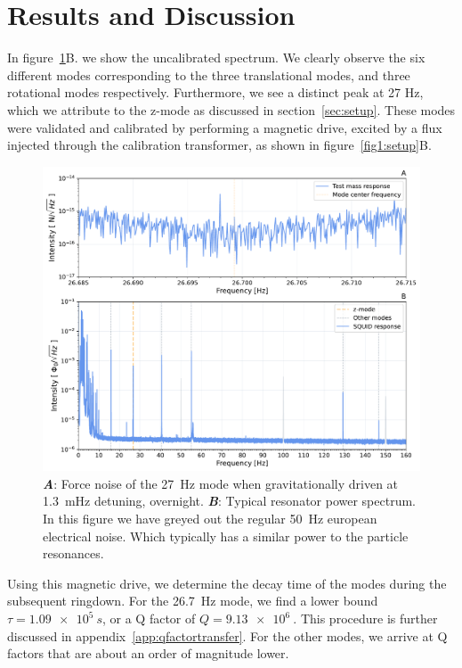 \section{Results and  Discussion} \label{sec:results}
In figure~\ref{fig2:spectrum}B. we show the uncalibrated spectrum.
We clearly observe the six different modes corresponding to the three translational modes, and three rotational modes respectively. 
Furthermore, we see a distinct peak at 27 Hz, which we attribute to the z-mode as discussed in section~\ref{sec:setup}.
These modes were validated and calibrated by performing a magnetic drive, excited by a flux injected through the calibration transformer, as shown in figure~\ref{fig1:setup}B. 

\begin{figure}[ht]%
\centering
\includegraphics[width=\textwidth]{Results/paper_spectrum_combined.pdf}%
\caption{\textbf{\emph{A}}: Force noise of the \SI{27}{Hz} mode when gravitationally driven at \SI{1.3}{mHz} detuning, overnight. \textbf{\emph{B}}: Typical resonator power spectrum. In this figure we have greyed out the regular \SI{50}{Hz} european electrical noise. Which typically has a similar power to the particle resonances.}\label{fig2:spectrum}
\end{figure}

Using this magnetic drive, we determine the decay time of the modes during the subsequent ringdown. For the \SI{26.7}{Hz} mode, we find a lower bound  $\tau = \SI{1.09e5}{s}$, or a Q factor of $Q = \SI{9.13e6}{}$. This procedure is further discussed in appendix~\ref{app:qfactortransfer}. For the other modes, we arrive at Q factors that are about an order of magnitude lower.

